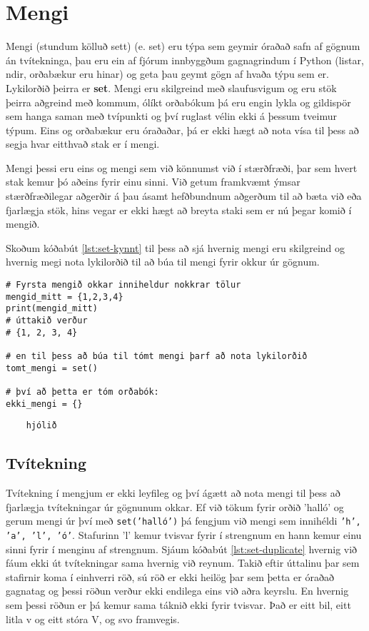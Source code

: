 
\chapter{Mengi}\label{k:sett}
Mengi (stundum kölluð sett) (e. set) eru týpa sem geymir óraðað safn af gögnum án tvítekninga, þau eru ein af fjórum innbyggðum gagnagrindum í Python (listar, ndir, orðabækur eru hinar) og geta þau geymt gögn af hvaða týpu sem er.
Lykilorðið þeirra er \textbf{set}.
Mengi eru skilgreind með slaufusvigum og eru stök þeirra aðgreind með kommum, ólíkt orðabókum þá eru engin lykla og gildispör sem hanga saman með tvípunkti og því ruglast vélin ekki á þessum tveimur týpum.
Eins og orðabækur eru óraðaðar, þá er ekki hægt að nota vísa til þess að segja hvar eitthvað stak er í mengi.

Mengi þessi eru eins og mengi sem við könnumst við í stærðfræði, þar sem hvert stak kemur þó aðeins fyrir einu sinni.
Við getum framkvæmt ýmsar stærðfræðilegar aðgerðir á þau ásamt hefðbundnum aðgerðum til að bæta við eða fjarlægja stök, hins vegar er ekki hægt að breyta staki sem er nú þegar komið í mengið.

Skoðum kóðabút \ref{lst:set-kynnt} til þess að sjá hvernig mengi eru skilgreind og hvernig megi nota lykilorðið til að búa til mengi fyrir okkur úr gögnum.

\begin{lstlisting}[caption=Mengi skilgreind, label=lst:set-kynnt]
# Fyrsta mengið okkar inniheldur nokkrar tölur
mengid_mitt = {1,2,3,4}
print(mengid_mitt)
# úttakið verður 
# {1, 2, 3, 4}

# en til þess að búa til tómt mengi þarf að nota lykilorðið
tomt_mengi = set()

# því að þetta er tóm orðabók:
ekki_mengi = {}
\end{lstlisting}
\lstset{style=uttak}
\begin{lstlisting}
	hjólið
\end{lstlisting}
\lstset{style=venjulegt}

\section{Tvítekning}
Tvítekning í mengjum er ekki leyfileg og því ágætt að nota mengi til þess að fjarlægja tvítekningar úr gögnunum okkar.
Ef við tökum fyrir orðið 'halló' og gerum mengi úr því með \texttt{set('halló')} þá fengjum við mengi sem innihéldi \texttt{'h', 'a', 'l', 'ó'}.
Stafurinn 'l' kemur tvisvar fyrir í strengnum en hann kemur einu sinni fyrir í menginu af strengnum.
Sjáum kóðabút \ref{lst:set-duplicate} hvernig við fáum ekki út tvítekningar sama hvernig við reynum.
Takið eftir úttalinu þar sem stafirnir koma í einhverri röð, sú röð er ekki heilög þar sem þetta er óraðað gagnatag og þessi röðun verður ekki endilega eins við aðra keyrslu.
En hvernig sem þessi röðun er þá kemur sama táknið ekki fyrir tvisvar.
Það er eitt bil, eitt litla v og eitt stóra V, og svo framvegis.

